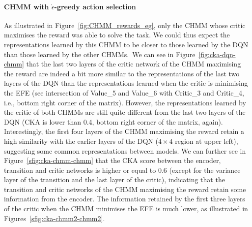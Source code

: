 \documentclass[twoside,11pt]{article}
\begin{document}
\paragraph{CHMM with $\mathring{\epsilon}$-greedy action selection}
As illustrated in Figure~\ref{fig:CHMM_rewards_eg}, only the CHMM whose critic maximises the reward was able to solve the task. We could thus expect the representations learned by this CHMM to be closer to those learned by the DQN than those learned by the other CHMMs.~We can see in Figure~\ref{fig:cka-dqn-chmm} that the last two layers of the critic network of the CHMM maximising the reward are indeed a bit more similar to the representations of the last two layers of the DQN than the representations learned when the critic is minimising the EFE (see intersection of Value\_5 and Value\_6 with Critic\_3 and Critic\_4, i.e., bottom right corner of the matrix). However, the representations learned by the critic of both CHMMs are still quite different from the last two layers of the DQN (CKA is lower than 0.4, bottom right corner of the matrix, again). Interestingly, the first four layers of the CHMM maximising the reward retain a high similarity with the earlier layers of the DQN ($4\times4$ region at upper left), suggesting some common representations between models. We can further see in Figure~\ref{sfig:cka-chmm-chmm} that the CKA score between the encoder, transition and critic networks is higher or equal to 0.6 (except for the variance layer of the transition and the last layer of the critic), indicating that the transition and critic networks of the CHMM maximising the reward retain some information from the encoder. The information retained by the first three layers of the critic when the CHMM minimises the EFE is much lower, as illustrated in Figures~\ref{sfig:cka-chmm2-chmm2}.
\end{document}
